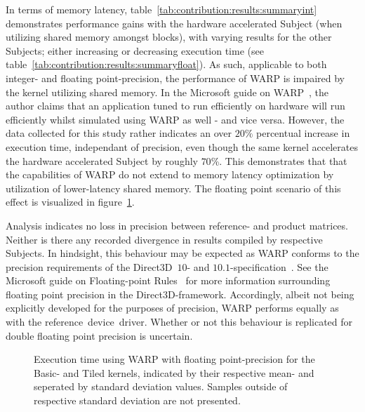 In terms of memory latency, table~\ref{tab:contribution:results:summaryint} demonstrates performance gains with the hardware accelerated Subject (when utilizing shared memory amongst blocks), with varying results for the other Subjects; either increasing or decreasing execution time (see table~\ref{tab:contribution:results:summaryfloat}).
As such, applicable to both integer- and floating point-precision, the performance of WARP is impaired by the kernel utilizing shared memory.
In the Microsoft guide on WARP~, the author claims that an application tuned to run efficiently on hardware will run efficiently whilst simulated using WARP as well - and vice versa.
However, the data collected for this study rather indicates an over $20\%$ percentual increase in execution time, independant of precision, even though the same kernel accelerates the hardware accelerated Subject by roughly $70$\%.
This demonstrates that that the capabilities of WARP do not extend to memory latency optimization by utilization of lower-latency shared memory.
The floating point scenario of this effect is visualized in figure~\ref{fig:contribution:results:warp:msswarp}.

Analysis indicates no loss in precision between reference- and product matrices.
Neither is there any recorded divergence in results compiled by respective Subjects.
In hindsight, this behaviour may be expected as WARP conforms to the precision requirements of the Direct3D~$10$- and $10.1$-specification~.
See the Microsoft guide on Floating-point Rules~ for more information surrounding floating point precision in the Direct3D-framework.
Accordingly, albeit not being explicitly developed for the purposes of precision, WARP performs equally as with the reference~device~driver.
Whether or not this behaviour is replicated for double floating point precision is uncertain.

\begin{figure}[htb]
\begin{center}
	\resizebox{ \columnwidth }{!}{}
	\caption{Execution time using WARP with floating point-precision for the Basic- and Tiled kernels, indicated by their respective mean- and seperated by standard deviation values. Samples outside of respective standard deviation are not presented.}
	\label{fig:contribution:results:warp:msswarp}
\end{center}
\end{figure}
